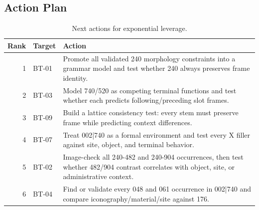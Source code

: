 \subsection{Action Plan}

\begin{table}[htbp]
\centering
\footnotesize
\begin{tabular}{rlp{}}
\toprule
\textbf{Rank} & \textbf{Target} & \textbf{Action} \\
\midrule
1 & BT-01 & Promote all validated 240 morphology constraints into a grammar model and test whether 240 always preserves frame identity. \\
2 & BT-03 & Model 740/520 as competing terminal functions and test whether each predicts following/preceding slot frames. \\
3 & BT-09 & Build a lattice consistency test: every stem must preserve frame while predicting context differences. \\
4 & BT-07 & Treat 002|740 as a formal environment and test every X filler against site, object, and terminal behavior. \\
5 & BT-02 & Image-check all 240-482 and 240-904 occurrences, then test whether 482/904 contrast correlates with object, site, or administrative context. \\
6 & BT-04 & Find or validate every 048 and 061 occurrence in 002|740 and compare iconography/material/site against 176. \\
\bottomrule
\end{tabular}
\caption{Next actions for exponential leverage.}
\end{table}
